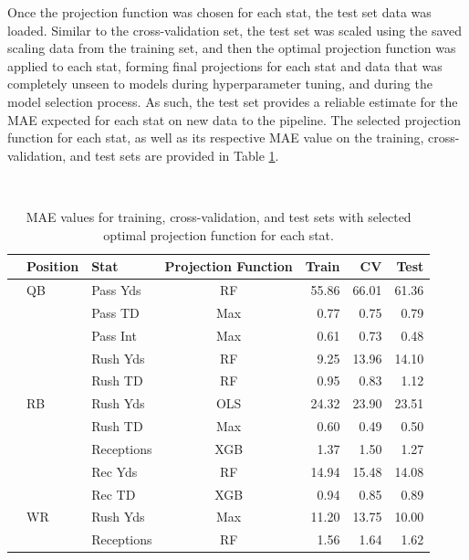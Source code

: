 \documentclass[12pt]{article}
\begin{document}
Once the projection function was chosen for each stat, the test set data was loaded. Similar to the cross-validation set, the test set was scaled using the saved scaling data from the training set, and then the optimal projection function was applied to each stat, forming final projections for each stat and data that was completely unseen to models during hyperparameter tuning, and during the model selection process. As such, the test set provides a reliable estimate for the MAE expected for each stat on new data to the pipeline. The selected projection function for each stat, as well as its respective MAE value on the training, cross-validation, and test sets are provided in Table \ref{train/cv/test table}.



﻿\begin{table}[H]
\caption{MAE values for training, cross-validation, and test sets with selected optimal projection function for each stat.}
\label{train/cv/test table}
\centering
\begin{tabular}{lllcrrr}
\toprule
{} & Position &        Stat & Projection Function &  Train &     CV &   Test \\
\midrule
{} &       QB &    Pass Yds &                  RF &  55.86 &  66.01 &  61.36 \\
{} &       {} &     Pass TD &                 Max &   0.77 &   0.75 &   0.79 \\
{} &       {} &    Pass Int &                 Max &   0.61 &   0.73 &   0.48 \\
{} &       {} &    Rush Yds &                  RF &   9.25 &  13.96 &  14.10 \\
{} &       {} &     Rush TD &                  RF &   0.95 &   0.83 &   1.12 \\
\midrule
{} &       RB &    Rush Yds &                 OLS &  24.32 &  23.90 &  23.51 \\
{} &       {} &     Rush TD &                 Max &   0.60 &   0.49 &   0.50 \\
{} &       {} &  Receptions &                 XGB &   1.37 &   1.50 &   1.27 \\
{} &       {} &     Rec Yds &                  RF &  14.94 &  15.48 &  14.08 \\
{} &       {} &      Rec TD &                 XGB &   0.94 &   0.85 &   0.89 \\
\midrule
{} &       WR &    Rush Yds &                 Max &  11.20 &  13.75 &  10.00 \\
{} &       {} &  Receptions &                  RF &   1.56 &   1.64 &   1.62 \\

\end{tabular}
\end{table}
\end{document}
